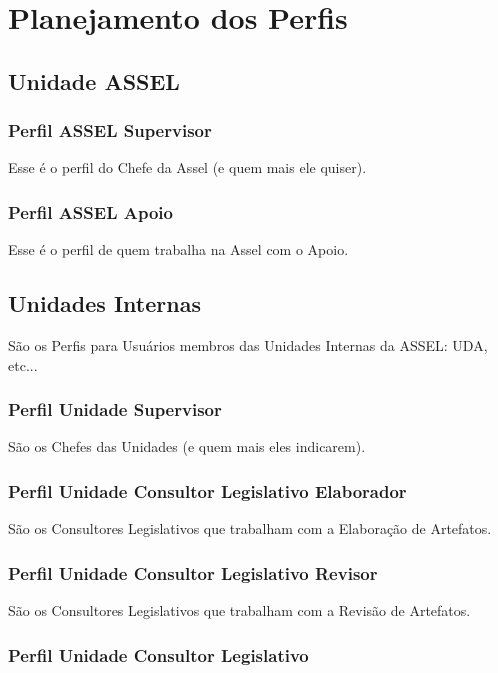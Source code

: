 \chapter{Planejamento dos Perfis}

\section{Unidade ASSEL}

	\subsection{Perfil ASSEL Supervisor}
	
	Esse é o perfil do Chefe da Assel (e quem mais ele quiser).
	
	
	\subsection{Perfil ASSEL Apoio}
	
	Esse é o perfil de quem trabalha na Assel com o Apoio.

\section{Unidades Internas}

São os Perfis para Usuários membros das Unidades Internas da ASSEL: UDA, etc...


	\subsection{Perfil Unidade Supervisor}
	
	São os Chefes das Unidades (e quem mais eles indicarem).

	\subsection{Perfil Unidade Consultor Legislativo Elaborador}
	
	São os Consultores Legislativos que trabalham com a Elaboração de Artefatos.
	
	\subsection{Perfil Unidade Consultor Legislativo Revisor}
	
	São os Consultores Legislativos que trabalham com a Revisão de Artefatos.
	
	\subsection{Perfil Unidade Consultor Legislativo}
	
